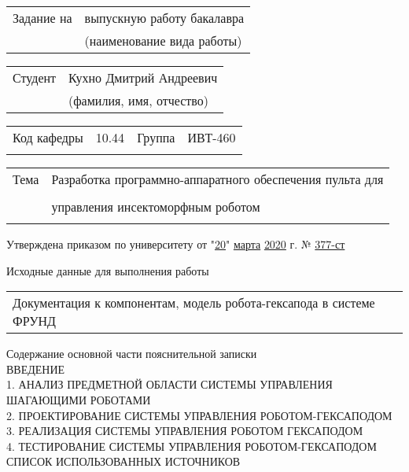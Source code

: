 \bigskip
\bigskip
\bigskip

\noindent
\begin{tabularx}{\linewidth}{@{}lY@{}}
	Задание на & выпускную работу бакалавра \\
	& \footnotesize(наименование вида работы)\normalsize
\end{tabularx}

\noindent
\begin{tabularx}{\linewidth}{@{}lY@{}}
	Студент & Кухно Дмитрий Андреевич \\
	& \footnotesize(фамилия, имя, отчество)\normalsize
\end{tabularx}


\noindent
\begin{tabularx}{\linewidth}{@{}lXlX@{}}
    Код кафедры & 10.44 & Группа & ИВТ-460 \\
    \cline{2-2}\cline{4-4}\\
\end{tabularx}

\begin{nospasing}
\noindent
\begin{tabularx}{\linewidth}{@{}lX@{}}
    Тема & Разработка программно-аппаратного обеспечения пульта для\\
           \cline{2-2}\\
         & управления инсектоморфным роботом \\
         \cline{2-2}\\
\end{tabularx}
\end{nospasing}

\noindent
Утверждена приказом по университету от "\underline{20}"{} \underline{марта} \underline{2020} г. № \underline{377-ст}\\


\bigskip

\noindent
Исходные данные для выполнения работы \\
\renewcommand{\arraystretch}{1.5}
\begin{tabularx}{\linewidth}{@{}X@{}}
	Документация к компонентам, модель робота-гексапода в системе ФРУНД\\
	\cline{1-1}
\end{tabularx} 

\bigskip

\noindent
Содержание основной части пояснительной записки\\
\noindent
\renewcommand{\arraystretch}{1}
    ВВЕДЕНИЕ \\
    1. АНАЛИЗ ПРЕДМЕТНОЙ ОБЛАСТИ СИСТЕМЫ УПРАВЛЕНИЯ ШАГАЮЩИМИ РОБОТАМИ \\
    2. ПРОЕКТИРОВАНИЕ СИСТЕМЫ УПРАВЛЕНИЯ РОБОТОМ-ГЕКСАПОДОМ \\
    3. РЕАЛИЗАЦИЯ СИСТЕМЫ УПРАВЛЕНИЯ РОБОТОМ ГЕКСАПОДОМ \\
    4. ТЕСТИРОВАНИЕ СИСТЕМЫ УПРАВЛЕНИЯ РОБОТОМ-ГЕКСАПОДОМ \\
    СПИСОК ИСПОЛЬЗОВАННЫХ ИСТОЧНИКОВ

